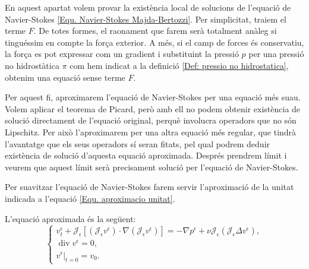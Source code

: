 \documentclass{article}
\numberwithin{equation}{section}
\DeclareMathOperator{\diver}{div}
\begin{document}
En aquest apartat volem provar la exist\`{e}ncia local de solucions de l'equaci\'{o} de Navier-Stokes \eqref{Equ. Navier-Stokes Majda-Bertozzi}. Per simplicitat, traiem el terme $F$. De totes formes, el raonament que farem ser\`{a} totalment an\`{a}leg si tingu\'{e}ssim en compte la for\c{c}a exterior. A m\'{e}s, si el camp de forces \'{e}s conservatiu, la for\c{c}a es pot expressar com un gradient i substituint la pressi\'{o} $p$ per una pressi\'{o} no hidrost\`{a}tica $\pi$ com hem indicat a la definici\'{o} \ref{Def: pressio no hidrostatica}, obtenim una equaci\'{o} sense terme $F$.
\vspace{3mm}

Per aquest fi, aproximarem l'equaci\'{o} de Navier-Stokes per una equaci\'{o} m\'{e}s suau. Volem aplicar el teorema de Picard, per\`{o} amb ell no podem obtenir exist\`{e}ncia de soluci\'{o} directament de l'equaci\'{o} original, perqu\`{e} involucra operadors que no s\'{o}n Lipschitz. Per aix\`{o} l'aproximarem per una altra equaci\'{o} m\'{e}s regular, que tindr\`{a} l'avantatge que els seus operadors s\'{i} seran fitats, pel qual podrem deduir exist\`{e}ncia de soluci\'{o} d'aquesta equaci\'{o} aproximada. Despr\'{e}s prendrem l\'{i}mit i veurem que aquest l\'{i}mit ser\`{a} precisament soluci\'{o} per l'equaci\'{o} de Navier-Stokes.

Per suavitzar l'equaci\'{o} de Navier-Stokes farem servir l'aproximaci\'{o} de la unitat indicada a l'equaci\'{o} \eqref{Equ. aproximacio unitat}.

L'equaci\'{o} aproximada \'{e}s la seg\"{u}ent:
\begin{equation}
\left\{\begin{array}{l}v_t^{\epsilon}+\mathcal{J}_{\epsilon}[(\mathcal{J}_{\epsilon}v^{\epsilon})\cdot\nabla(\mathcal{J}_{\epsilon}v^{\epsilon})]=-\nabla p^{\epsilon}+\nu\mathcal{J}_{\epsilon}(\mathcal{J}_{\epsilon}\Delta v^{\epsilon}),\\\diver v^{\epsilon}=0,\\v^{\epsilon}|_{t=0}=v_0.\end{array}\right.
\end{equation}
\end{document}

